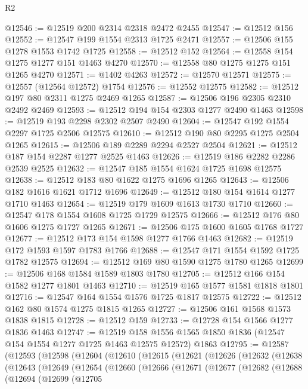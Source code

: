 \begin{lexlean}{R2}
\begin{coremodule}
@12546 := @12519 @200 @2314 @2318 @2472 @2455
@12547 := @12512 @156
@12552 := @12547 @199 @1554 @2313 @1725 @2471
@12557 := @12506 @155 @1278 @1553 @1742 @1725
@12558 := @12512 @152
@12564 := @12558 @154 @1275 @1277 @151 @1463 @4270
@12570 := @12558 @80 @1275 @1275 @151 @1265 @4270
@12571 := @1402 @4263
@12572 := @12570 @12571
@12575 := @12557 (@12564 @12572) @1754
@12576 := @12552 @12575
@12582 := @12512 @197 @80 @2311 @1275 @2469 @1265
@12587 := @12506 @196 @2305 @2310 @2492 @2469
@12593 := @12512 @194 @154 @2303 @1277 @2490 @1463
@12598 := @12519 @193 @2298 @2302 @2507 @2490
@12604 := @12547 @192 @1554 @2297 @1725 @2506 @12575
@12610 := @12512 @190 @80 @2295 @1275 @2504 @1265
@12615 := @12506 @189 @2289 @2294 @2527 @2504
@12621 := @12512 @187 @154 @2287 @1277 @2525 @1463
@12626 := @12519 @186 @2282 @2286 @2539 @2525
@12632 := @12547 @185 @1554 @1624 @1725 @1698 @12575
@12638 := @12512 @183 @80 @1622 @1275 @1696 @1265
@12643 := @12506 @182 @1616 @1621 @1712 @1696
@12649 := @12512 @180 @154 @1614 @1277 @1710 @1463
@12654 := @12519 @179 @1609 @1613 @1730 @1710
@12660 := @12547 @178 @1554 @1608 @1725 @1729 @12575
@12666 := @12512 @176 @80 @1606 @1275 @1727 @1265
@12671 := @12506 @175 @1600 @1605 @1768 @1727
@12677 := @12512 @173 @154 @1598 @1277 @1766 @1463
@12682 := @12519 @172 @1593 @1597 @1783 @1766
@12688 := @12547 @171 @1554 @1592 @1725 @1782 @12575
@12694 := @12512 @169 @80 @1590 @1275 @1780 @1265
@12699 := @12506 @168 @1584 @1589 @1803 @1780
@12705 := @12512 @166 @154 @1582 @1277 @1801 @1463
@12710 := @12519 @165 @1577 @1581 @1818 @1801
@12716 := @12547 @164 @1554 @1576 @1725 @1817 @12575
@12722 := @12512 @162 @80 @1574 @1275 @1815 @1265
@12727 := @12506 @161 @1568 @1573 @1838 @1815
@12728 := @12512 @159
@12733 := @12728 @154 @1566 @1277 @1836 @1463
@12747 := @12519
    @158
    @1556
    @1565
    @1850
    @1836
    (@12547 @154 @1554 @1277 @1725 @1463 @12575 @12572)
    @1863
@12795 := @12587
    (@12593
      (@12598
        (@12604
          (@12610
            (@12615
              (@12621
                (@12626
                  (@12632
                    (@12638
                      (@12643
                        (@12649
                          (@12654
                            (@12660
                              (@12666
                                (@12671
                                  (@12677
                                    (@12682
                                      (@12688
                                        (@12694
                                          (@12699
                                            (@12705

\end{coremodule}
\end{lexlean}
